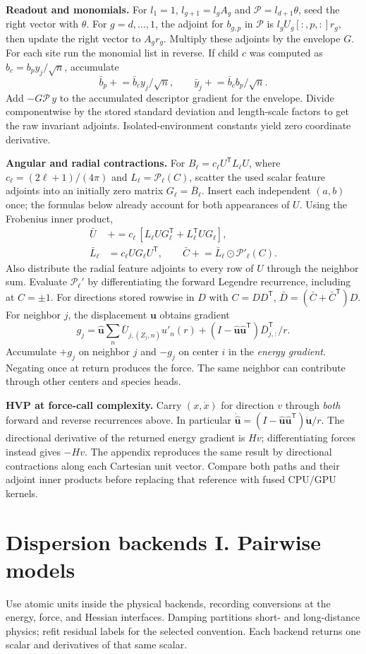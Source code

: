 \documentclass[11pt,a4paper]{article}
\newcommand{\T}{\mathsf T}\newcommand{\tr}{\operatorname{tr}}
\begin{document}
\textbf{Readout and monomials.} For $l_1=1$, $l_{g+1}=l_g A_g$ and $\mathcal P=l_{d+1}\theta$, seed the right vector with $\theta$. For $g=d,\ldots,1$, the adjoint for $b_{g,p}$ in $\mathcal P$ is $l_g U_g[:,p,:]r_g$, then update the right vector to $A_g r_g$. Multiply these adjoints by the envelope $G$. For each site run the monomial list in reverse. If child $c$ was computed as $b_c=b_p y_j/\sqrt{n}$, accumulate
\[
 \bar b_p\mathrel{+}=\bar b_c y_j/\sqrt{n},\qquad
 \bar y_j\mathrel{+}=\bar b_c b_p/\sqrt{n}.
\]
Add $-G\mathcal P\,y$ to the accumulated descriptor gradient for the envelope. Divide componentwise by the stored standard deviation and length-scale factors to get the raw invariant adjoints. Isolated-environment constants yield zero coordinate derivative.

\textbf{Angular and radial contractions.} For $B_\ell=c_\ell U^\T L_\ell U$, where $c_\ell=(2\ell+1)/(4\pi)$ and $L_\ell=\mathcal P_\ell(C)$, scatter the used scalar feature adjoints into an initially zero matrix $G_\ell=\bar B_\ell$. Insert each independent $(a,b)$ once; the formulas below already account for both appearances of $U$. Using the Frobenius inner product,
\begin{align*}
 \bar U&\mathrel{+}=c_\ell\,[L_\ell U G_\ell^\T+L_\ell^\T U G_\ell],\\
 \bar L_\ell&=c_\ell U G_\ell U^\T,\qquad
 \bar C\mathrel{+}=\bar L_\ell\odot\mathcal P'_\ell(C).
\end{align*}
Also distribute the radial feature adjoints to every row of $U$ through the neighbor sum. Evaluate $\mathcal P_\ell'$ by differentiating the forward Legendre recurrence, including at $C=\pm1$. For directions stored rowwise in $D$ with $C=DD^\T$, $\bar D=(\bar C+\bar C^\T)D$. For neighbor $j$, the displacement $\mathbf u$ obtains gradient
\[
 g_j=\hat{\mathbf u}\sum_n \bar U_{j,(Z_j,n)} u'_n(r)+
         (I-\hat{\mathbf u}\hat{\mathbf u}^\T)\bar D_{j,:}^\T/r .
\]
Accumulate $+g_j$ on neighbor $j$ and $-g_j$ on center $i$ in the \emph{energy gradient}. Negating once at return produces the force. The same neighbor can contribute through other centers and species heads.

\textbf{HVP at force-call complexity.} Carry $(x,\dot x)$ for direction $v$ through \emph{both} forward and reverse recurrences above. In particular $\dot{\hat{\mathbf u}}=(I-\hat{\mathbf u}\hat{\mathbf u}^\T)\dot{\mathbf u}/r$. The directional derivative of the returned energy gradient is $Hv$; differentiating forces instead gives $-Hv$. The appendix reproduces the same result by directional contractions along each Cartesian unit vector. Compare both paths and their adjoint inner products before replacing that reference with fused CPU/GPU kernels.
\pg\section{Dispersion backends I. Pairwise models}
Use atomic units inside the physical backends, recording conversions at the energy, force, and Hessian interfaces. Damping partitions short- and long-distance physics; refit residual labels for the selected convention. Each backend returns one scalar and derivatives of that same scalar.
\end{document}
